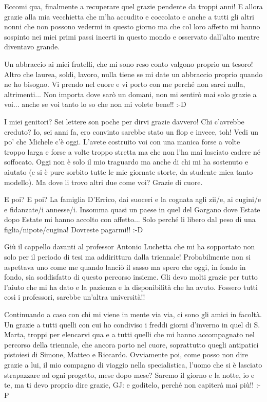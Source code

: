 \thispagestyle{empty}

\footnotesize

Eccomi qua, finalmente a recuperare quel grazie pendente da troppi anni! E allora grazie alla mia vecchietta che m'ha accudito e coccolato e anche a tutti gli altri nonni che non possono vedermi in questo giorno ma che col loro affetto mi hanno sospinto nei miei primi passi incerti in questo mondo e osservato dall'alto mentre diventavo grande.

Un abbraccio ai miei fratelli, che mi sono reso conto valgono proprio un tesoro! Altro che laurea, soldi, lavoro, nulla tiene se mi date un abbraccio proprio quando ne ho bisogno. Vi prendo nel cuore e vi porto con me perché non sarei nulla, altrimenti... Non importa dove sarò un domani, non mi sentirò mai solo grazie a voi... anche se voi tanto lo so che non mi volete bene!! :-D

I miei genitori? Sei lettere son poche per dirvi grazie davvero! Chi c'avrebbe creduto? Io, sei anni fa, ero convinto sarebbe stato un flop e invece, toh! Vedi un po' che Michele c'è oggi. L'avete costruito voi con una manica forse a volte troppo larga e forse a volte troppo stretta ma che non l'ha mai lasciato cadere né soffocato. Oggi non è solo il mio traguardo ma anche di chi mi ha sostenuto e aiutato (e si è pure sorbito tutte le mie giornate storte, da studente mica tanto modello). Ma dove li trovo altri due come voi? Grazie di cuore.

E poi? E poi? La famiglia D'Errico, dai suoceri e la cognata agli zii/e, ai cugini/e e fidanzate/i annesse/i. Insomma quasi un paese in quel del Gargano dove Estate dopo Estate mi hanno accolto con affetto... Solo perché li libero dal peso di una figlia/nipote/cugina! Dovreste pagarmi!! :-D

Giù il cappello davanti al professor Antonio Luchetta che mi ha sopportato non solo per il periodo di tesi ma addirittura dalla triennale! Probabilmente non si aspettava uno come me quando lanciò il sasso ma spero che oggi, in fondo in fondo, sia soddisfatto di questo percorso insieme. Gli devo molti grazie per tutto l'aiuto che mi ha dato e la pazienza e la disponibilità che ha avuto. Fossero tutti così i professori, sarebbe un'altra università!!

Continuando a caso con chi mi viene in mente via via, ci sono gli amici in facoltà. Un grazie a tutti quelli con cui ho condiviso i freddi giorni d'inverno in quel di S. Marta, troppi per elencarvi qua e a tutti quelli che mi hanno accompagnato nel percorso della triennale, che ancora porto nel cuore, soprattutto quegli antipatici pistoiesi di Simone, Matteo e Riccardo. Ovviamente poi, come posso non dire grazie a lui, il mio compagno di viaggio nella specialistica, l'uomo che si è lasciato strapazzare ad ogni progetto, mese dopo mese? Saremo il giorno e la notte, io e te, ma ti devo proprio dire grazie, GJ: e goditelo, perché non capiterà mai più!! :-P

